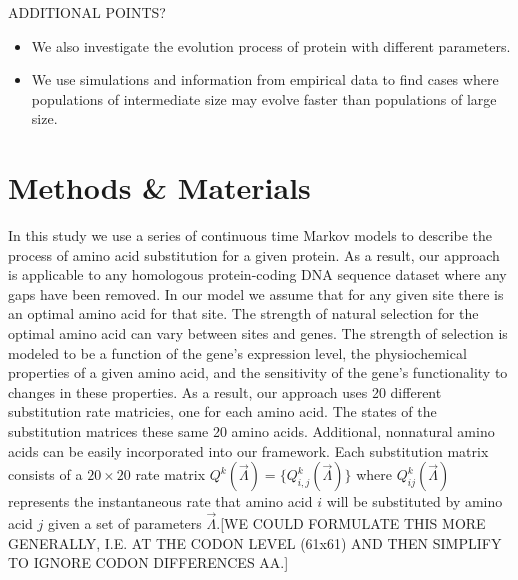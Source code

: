 \documentclass[13pt]{article}
\begin{document}
ADDITIONAL POINTS?
\begin{itemize}
\item We also investigate the evolution process of protein with different parameters.
\item We use simulations and information from empirical data to find cases where populations of intermediate size may evolve faster than populations of large size.
\end{itemize}


\section{Methods \& Materials}
In this study we use a series of continuous time Markov models to describe the process of amino acid substitution for a given protein.
As a result, our approach is applicable to any homologous protein-coding DNA sequence dataset where any gaps have been removed.
In our model we assume that for any given site there is an optimal amino acid for that site.
The strength of natural selection for the optimal amino acid can vary between sites and genes.
The strength of selection is modeled to be a function of the gene's expression level, the physiochemical properties of a given amino acid, and the sensitivity of the gene's functionality to changes in these properties.
As a result, our approach uses 20 different substitution rate matricies, one for each amino acid. 
The states of the substitution matrices these same 20 amino acids.
Additional, nonnatural amino acids can be easily incorporated into our framework.
Each substitution matrix consists of a  $20 \times 20$ rate matrix $Q^k(\vec{\Lambda})=\{Q^k_{i,j}(\vec{\Lambda})\}$ where $Q^k_{ij}(\vec{\Lambda})$ represents the instantaneous rate that amino acid $i$ will be substituted by amino acid $j$ given a set of parameters $\vec{\Lambda}$.[WE COULD FORMULATE THIS MORE GENERALLY, I.E. AT THE CODON LEVEL (61x61) AND THEN SIMPLIFY TO IGNORE CODON DIFFERENCES AA.]
\end{document}
